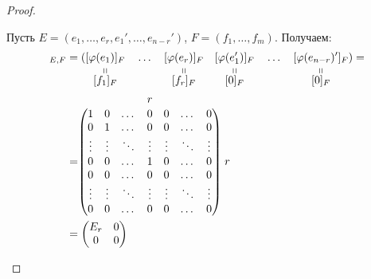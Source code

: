 \begin{proof}
\begin{itemize}
        Пусть $E = (e_1, \dots, e_r, e_1', \dots, e_{n-r}')$,
        $F = (f_1, \dots, f_m)$. 
        Получаем:
        \begin{align*}
            [\varphi]_{E,F} &= 
            (\stackbelow{[\varphi(e_1)]_F}{[f_1]_F} 
            \quad \dots \quad 
            \stackbelow{[\varphi(e_r)]_F}{[f_r]_F} \quad
            \stackbelow{[\varphi(e_1')]_F}{[0]_F} \quad \dots \quad 
            \stackbelow{[\varphi(e_{n-r})']_F}{[0]_F}) = \\
            &= 
            \stackrel{\begin{matrix}
                & & & r & & &
            \end{matrix}}
            {\begin{pmatrix}
                1 & 0 & \dots & 0 & 0 & \dots & 0 \\
                0 & 1 & \dots & 0 & 0 & \dots & 0 \\
                \vdots & \vdots & \ddots & \vdots & \vdots & \ddots & \vdots \\
                0 & 0 & \dots & 1 & 0 & \dots & 0 \\
                0 & 0 & \dots & 0 & 0 & \dots & 0 \\
                \vdots & \vdots & \ddots & \vdots & \vdots & \ddots & \vdots \\
                0 & 0 & \dots & 0 & 0 & \dots & 0 \\
            \end{pmatrix}}
            \begin{matrix}
                \\ \\ r \\ \\ \\
            \end{matrix} \\
            &=
            \begin{pmatrix}
                E_r & 0 \\
                0 & 0
            \end{pmatrix}
        \end{align*} 
        
    \end{itemize}
\end{proof}

